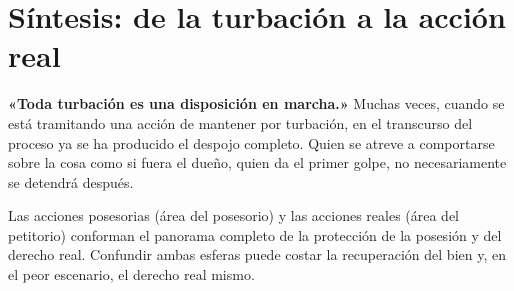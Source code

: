 \documentclass[12pt,oneside]{book}
\begin{document}
\section{Síntesis: de la turbación a la acción real}

\begin{importante}
\textbf{«Toda turbación es una disposición en marcha.»} Muchas veces, cuando se está tramitando una acción de mantener por turbación, en el transcurso del proceso ya se ha producido el despojo completo. Quien se atreve a comportarse sobre la cosa como si fuera el dueño, quien da el primer golpe, no necesariamente se detendrá después.
\end{importante}

Las acciones posesorias (área del posesorio) y las acciones reales (área del petitorio) conforman el panorama completo de la protección de la posesión y del derecho real. Confundir ambas esferas puede costar la recuperación del bien y, en el peor escenario, el derecho real mismo.
\end{document}
